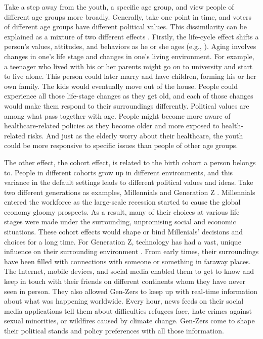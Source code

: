 \documentclass[a4paper, 12pt]{article}\usepackage[dvipdfmx]{graphicx}\usepackage[]{xcolor}
\begin{document}
Take a step away from the youth, a specific age group, and view people of different age groups more broadly. Generally, take one point in time, and voters of different age groups have different political values. This dissimilarity can be explained as a mixture of two different effects \citep{inglehart2008changing, dimock2019defining, webster2019older}. Firstly, the life-cycle effect shifts a person's values, attitudes, and behaviors as he or she ages (e.g., \citet{plutzer2002becoming}). Aging involves changes in one's life stage and changes in one's living environment. For example, a teenager who lived with his or her parents might go on to university and start to live alone. This person could later marry and have children, forming his or her own family. The kids would eventually move out of the house. People could experience all those life-stage changes as they get old, and each of those changes would make them respond to their surroundings differently. Political values are among what pass together with age. People might become more aware of healthcare-related policies as they become older and more exposed to health-related risks. And just as the elderly worry about their healthcare, the youth could be more responsive to specific issues than people of other age groups. 

The other effect, the cohort effect, is related to the birth cohort a person belongs to. People in different cohorts grow up in different environments, and this variance in the default settings leads to different political values and ideas. Take two different generations as examples, Millennials and Generation Z \footnotemark{}. Millennials entered the workforce as the large-scale recession started to cause the global economy gloomy prospects. As a result, many of their choices at various life stages were made under the surrounding, unpromising social and economic situations. These cohort effects would shape or bind Millenials' decisions and choices for a long time. For Generation Z, technology has had a vast, unique influence on their surrounding environment \citep{dimock2019defining}. From early times, their surroundings have been filled with connections with someone or something in faraway places. The Internet, mobile devices, and social media enabled them to get to know and keep in touch with their friends on different continents whom they have never seen in person. They also allowed Gen-Zers to keep up with real-time information about what was happening worldwide. Every hour, news feeds on their social media applications tell them about difficulties refugees face, hate crimes against sexual minorities, or wildfires caused by climate change. Gen-Zers come to shape their political stands and policy preferences with all those information. 
\end{document}
